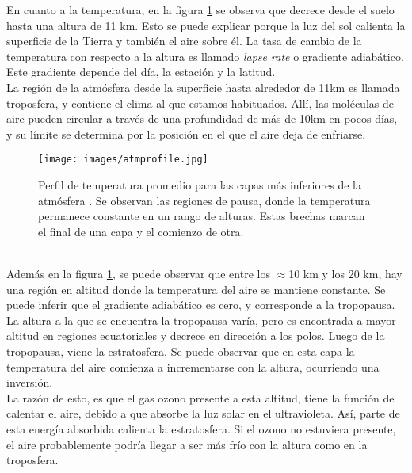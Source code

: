 En cuanto a la temperatura, en la figura \ref{fig:fig10} se observa que decrece desde el suelo hasta una altura de 11 km. Esto se puede explicar porque la luz del sol calienta la superficie de la Tierra y también el aire sobre él. La tasa de cambio de la temperatura con respecto a la altura es llamado \textit{lapse rate} o gradiente adiabático. Este gradiente depende del día, la estación y la latitud.\\

La región de la atmósfera desde la superficie hasta alrededor de 11km es llamada troposfera, y contiene el clima al que estamos habituados. Allí, las moléculas de aire pueden circular a través de una profundidad de más de 10km en pocos días, y su límite se determina por la posición en el que el aire deja de enfriarse.\\

\begin{figure}[htb!]
        \begin{center}
		\texttt{[image: images/atmprofile.jpg]}
        \end{center}
        \caption[Temperatura promedio para las capas inferiores de la atmósfera.]{Perfil de temperatura promedio para las capas más inferiores de la atmósfera \cite{NOAA}. Se observan las regiones de pausa, donde la temperatura permanece constante en un rango de alturas. Estas brechas marcan el final de una capa y el comienzo de otra.}
        \label{fig:fig10}
\end{figure}\\
Además en la figura \ref{fig:fig10}, se puede observar que entre los $\approx$10 km y los 20 km, hay una región en altitud donde la temperatura del aire se mantiene constante. Se puede inferir que el gradiente adiabático es cero, y corresponde a la tropopausa. La altura a la que se encuentra la tropopausa varía, pero es encontrada a mayor altitud en regiones ecuatoriales y decrece en dirección a los polos. Luego de la tropopausa, viene la estratosfera. Se puede observar que en esta capa la temperatura del aire comienza a incrementarse con la altura, ocurriendo una inversión.\\

La razón de esto, es que el gas ozono presente a esta altitud, tiene la función de calentar el aire, debido a que absorbe la luz solar en el ultravioleta. Así, parte de esta energía absorbida calienta la estratosfera. Si el ozono no estuviera presente, el aire probablemente podría llegar a ser más frío con la altura como en la troposfera.\\

